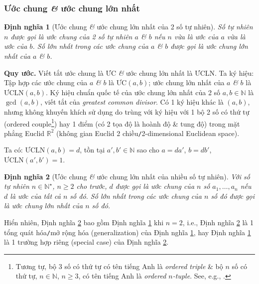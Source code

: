 \documentclass{article}
\numberwithin{equation}{section}
\newtheorem{dinhnghia}{Định nghĩa}[section]
\begin{document}
\subsubsection{Ước chung \textit{\&} ước chung lớn nhất}

\begin{dinhnghia}[Ước chung \textit{\&} ước chung lớn nhất của 2 số tự nhiên]
	\label{def: ước chung 2 số}
	Số tự nhiên $n$ được gọi là \emph{ước chung} của 2 số tự nhiên $a$ \textit{\&} $b$ nếu $n$ vừa là ước của $a$ vừa là ước của $b$. Số lớn nhất trong các ước chung của $a$ \textit{\&} $b$ được gọi là \emph{ước chung lớn nhất} của $a$ \textit{\&} $b$.
\end{dinhnghia}
\noindent\textbf{Quy ước.} Viết tắt ước chung là ƯC \textit{\&} ước chung lớn nhất là ƯCLN. Ta ký hiệu: Tập hợp các ước chung của $a$ \textit{\&} $b$ là $\mbox{ƯC}(a,b)$; ước chung lớn nhất của $a$ \textit{\&} $b$ là $\mbox{ƯCLN}(a,b)$. Ký hiệu chuẩn quốc tế của ước chung lớn nhất của 2 số $a,b\in\mathbb{N}$ là $\gcd(a,b)$, viết tắt của \textit{greatest common divisor}. Có 1 ký hiệu khác là $(a,b)$, nhưng không khuyến khích sử dụng do trùng với ký hiệu với 1 bộ 2 số có thứ tự (ordered couple\footnote{Tương tự, bộ 3 số có thứ tự có tên tiếng Anh là \textit{ordered triple} \& bộ $n$ số có thứ tự, $n\in\mathbb{N}$, $n\ge 3$, có tên tiếng Anh là \textit{ordered $n$-tuple}. See, e.g., \cite{Rudin1976}.}) hay 1 điểm (có 2 tọa độ là hoành độ \& tung độ) trong mặt phẳng Euclid $\mathbb{R}^2$ (không gian Euclid 2 chiều\texttt{/}2-dimensional Euclidean space).

Ta có: $\mbox{ƯCLN}(a,b)= d$, tồn tại $a',b'\in\mathbb{N}$ sao cho $a = da'$, $b = db'$, $\mbox{ƯCLN}(a',b') = 1$.

\begin{dinhnghia}[Ước chung \textit{\&} ước chung lớn nhất của nhiều số tự nhiên]
	\label{def: ước chung nhiều số}
	Với số tự nhiên $n\in\mathbb{N}^\star$, $n\ge 2$ cho trước, $d$ được gọi là \emph{ước chung} của $n$ số $a_1,\ldots,a_n$ nếu $d$ là ước của tất cả $n$ số đó. Số lớn nhất trong các ước chung của $n$ số đó được gọi là \emph{ước chung lớn nhất} của $n$ số đó.
\end{dinhnghia}
Hiển nhiên, Định nghĩa \ref{def: ước chung nhiều số} bao gồm Định nghĩa \ref{def: ước chung 2 số} khi $n = 2$, i.e., Định nghĩa \ref{def: ước chung nhiều số} là 1 tổng quát hóa\texttt{/}mở rộng hóa (generalization) của Định nghĩa \ref{def: ước chung 2 số}, hay Định nghĩa \ref{def: ước chung 2 số} là 1 trường hợp riêng (special case) của Định nghĩa \ref{def: ước chung nhiều số}.
\end{document}
